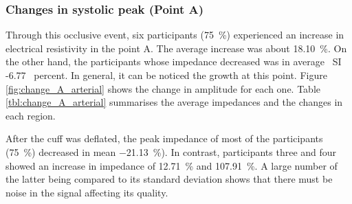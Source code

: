 \subsubsection{Changes in systolic peak (Point A)}
\label{section results 3.2.1}
Through this occlusive event, six participants (\SI{75}{\percent}) experienced an increase in electrical resistivity in the point A. The average increase was about \SI{18.10}{\percent}.  On the other hand, the participants whose impedance decreased was in average \ SI {-6.77} {\ percent}. In general, it can be noticed the growth at this point. Figure \ref{fig:change_A_arterial} shows the change in amplitude for each one. Table \ref{tbl:change_A_arterial} summarises the average impedances and the changes in each region. 

After the cuff was deflated, the peak impedance of most of the participants (\SI{75}{\percent})  decreased in mean \SI{-21.13}{\percent}).  In contrast, participants three and four showed an increase in impedance of \SI{12.71}{\percent} and \SI{107.91}{\percent}. A large number of the latter being compared to its standard deviation shows that there must be noise in the signal affecting its quality.   

